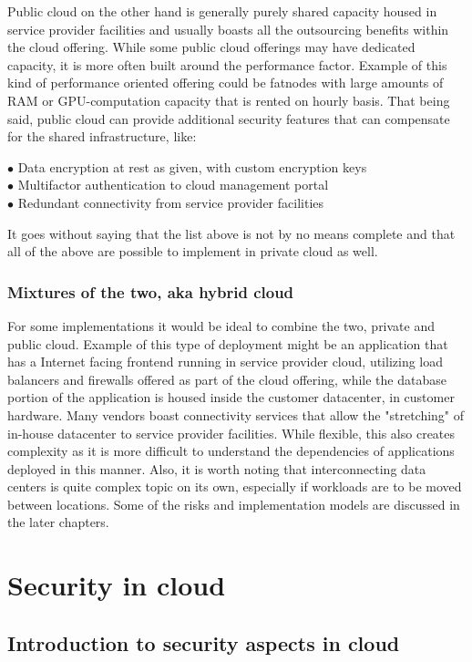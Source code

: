 \documentclass{article}
\begin{document}
\par
Public cloud on the other hand is generally purely shared capacity housed in service provider facilities and usually boasts all the outsourcing benefits within the cloud offering. While some public cloud offerings may have dedicated capacity, it is more often built around the performance factor. Example of this kind of performance oriented offering could be fatnodes with large amounts of RAM or GPU-computation capacity that is rented on hourly basis. That being said, public cloud can provide additional security features that can compensate for the shared infrastructure, like:
\begin{description}
	\item[$\bullet$ Data encryption at rest as given, with custom encryption keys]
	\item[$\bullet$ Multifactor authentication to cloud management portal]
	\item[$\bullet$ Redundant connectivity from service provider facilities]
\end{description}
It goes without saying that the list above is not by no means complete and that all of the above are possible to implement in private cloud as well.
\subsubsection{Mixtures of the two, aka hybrid cloud}
For some implementations it would be ideal to combine the two, private and public cloud. Example of this type of deployment might be an application that has a Internet facing frontend running in service provider cloud, utilizing load balancers and firewalls offered as part of the cloud offering, while the database portion of the application is housed inside the customer datacenter, in customer hardware. Many vendors boast connectivity services that allow the "stretching" of in-house datacenter to service provider facilities. While flexible, this also creates complexity as it is more difficult to understand the dependencies of applications deployed in this manner. Also, it is worth noting that interconnecting data centers is quite complex topic on its own, especially if workloads are to be moved between locations. Some of the risks and implementation models are discussed in the later chapters.
\section{Security in cloud}
\blindtext[2]
\subsection{Introduction to security aspects in cloud}
\blindtext[2]
\end{document}

